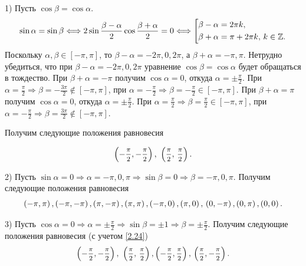 \documentclass[a4paper,12pt, openany]{book}
\theoremstyle{plain} %
\theoremstyle{definition} %
\theoremstyle{remark} %
\numberwithin{equation}{chapter}
\begin{document}
{1) Пусть $\cos\beta = \cos\alpha$. 
$$
\sin \alpha  = \sin \beta  \Longleftrightarrow 2\sin \frac{{\beta  - \alpha }}{2}\cos \frac{{\beta  + \alpha }}{2} = 0 \Longleftrightarrow \left[ {\begin{aligned}
   &\beta  - \alpha  = 2\pi k, \hfill  \\
   &\beta  + \alpha  = \pi  + 2\pi k,\,k \in \mathbb{Z}. \hfill  \\
\end{aligned}} \right.
$$
Поскольку $\alpha,\beta\in[-\pi,\pi]$, то $\beta - \alpha = -2\pi,0,2\pi$, а $\beta+\alpha = -\pi,\pi$. Нетрудно убедиться, что при $\beta - \alpha = -2\pi,0,2\pi$ уравнение $\cos\beta = \cos\alpha$ будет обращаться в тождество. При $\beta + \alpha = -\pi$ получим $\cos\alpha = 0$, откуда $\alpha = \pm\tfrac{\pi}{2}$. При $\alpha = \tfrac{\pi}{2} \Longrightarrow  \beta = -\tfrac{3\pi}{2} \notin [-\pi,\pi]$, при $\alpha = -\tfrac{\pi}{2} \Longrightarrow \beta = -\tfrac{\pi}{2} \in [-\pi,\pi]$.  При $\beta + \alpha = \pi$ получим $\cos\alpha = 0$, откуда $\alpha = \pm\tfrac{\pi}{2}$. При $\alpha = \tfrac{\pi}{2} \Longrightarrow  \beta = \tfrac{\pi}{2} \in [-\pi,\pi]$, при $\alpha = -\tfrac{\pi}{2} \Longrightarrow \beta = \tfrac{3\pi}{2} \notin [-\pi,\pi]$. 

Получим следующие положения равновесия

\begin{equation}\label{2.24}
\left( { - \mfrac{\pi }{2}, - \mfrac{\pi }{2}} \right),\,\,\left( {\mfrac{\pi }{2},\,\mfrac{\pi }{2}} \right).
\end{equation}

2) Пусть $\sin\alpha = 0 \Longrightarrow \alpha = -\pi,0,\pi \Longrightarrow \sin\beta = 0 \Longrightarrow \beta = -\pi,0,\pi$. Получим следующие положения равновесия
\begin{equation}\label{2.25}
\left( { - \pi ,\pi } \right),\left( { - \pi , - \pi } \right),\left( {\pi , - \pi } \right),\left( {\pi ,\pi } \right),\left( { - \pi ,0} \right),\left( {\pi ,0} \right),\\\left( {0, - \pi } \right),\left( {0,\pi } \right),\left( {0,0} \right).
\end{equation}

3) Пусть $\cos\alpha  = 0 \Longrightarrow \alpha = \pm\tfrac{\pi}{2} \Longrightarrow \sin\beta = \pm 1 \Longrightarrow \beta = \pm\tfrac{\pi}{2}$. Получим следующие положения равновесия (с учетом \eqref{2.24})
\begin{equation}\label{2.26}
\left( { - \mfrac{\pi }{2}, - \mfrac{\pi }{2}} \right),\,\,\left( {\mfrac{\pi }{2},\,\mfrac{\pi }{2}} \right),\left( { - \mfrac{\pi }{2},\mfrac{\pi }{2}} \right),\,\left( {\mfrac{\pi }{2}, - \mfrac{\pi }{2}} \right).
\end{equation}

}
\end{document}
